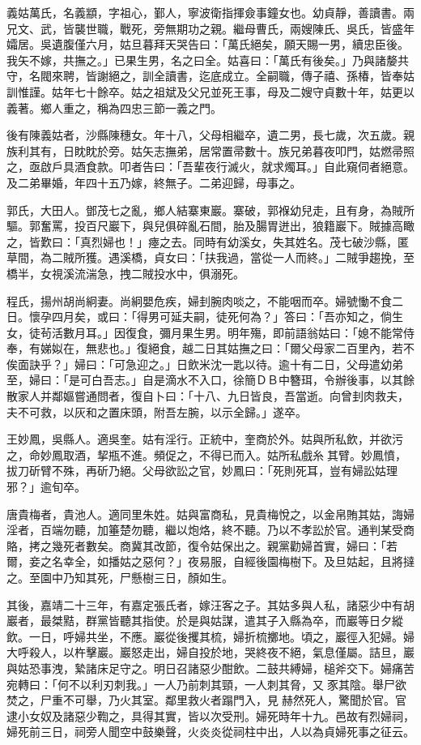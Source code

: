 \begin{pinyinscope}
義姑萬氏，名義顓，字祖心，鄞人，寧波衛指揮僉事鐘女也。幼貞靜，善讀書。兩兄文、武，皆襲世職，戰死，旁無期功之親。繼母曹氏，兩嫂陳氏、吳氏，皆盛年孀居。吳遺腹僅六月，姑旦暮拜天哭告曰：「萬氏絕矣，願天賜一男，續忠臣後。我矢不嫁，共撫之。」已果生男，名之曰全。姑喜曰：「萬氏有後矣。」乃與諸嫠共守，名閥來聘，皆謝絕之，訓全讀書，迄底成立。全嗣職，傳子禧、孫椿，皆奉姑訓惟謹。姑年七十餘卒。姑之祖斌及父兄並死王事，母及二嫂守貞數十年，姑更以義著。鄉人重之，稱為四忠三節一義之門。

後有陳義姑者，沙縣陳穗女。年十八，父母相繼卒，遺二男，長七歲，次五歲。親族利其有，日眈眈於旁。姑矢志撫弟，居常置帚數十。族兄弟暮夜叩門，姑燃帚照之，亟啟戶具酒食款。叩者告曰：「吾輩夜行滅火，就求燭耳。」自此窺伺者絕意。及二弟畢婚，年四十五乃嫁，終無子。二弟迎歸，母事之。

郭氏，大田人。鄧茂七之亂，鄉人結寨東巖。寨破，郭褓幼兒走，且有身，為賊所驅。郭奮罵，投百尺巖下，與兒俱碎亂石間，胎及腸胃迸出，狼籍巖下。賊據高瞰之，皆歎曰：「真烈婦也！」瘞之去。同時有幼溪女，失其姓名。茂七破沙縣，匿草間，為二賊所獲。遇溪橋，貞女曰：「扶我過，當從一人而終。」二賊爭趨挽，至橋半，女視溪流湍急，拽二賊投水中，俱溺死。

程氏，揚州胡尚絅妻。尚絅嬰危疾，婦刲腕肉啖之，不能咽而卒。婦號慟不食二日。懷孕四月矣，或曰：「得男可延夫嗣，徒死何為？」答曰：「吾亦知之，倘生女，徒茍活數月耳。」因復食，彌月果生男。明年殤，即前語翁姑曰：「媳不能常侍奉，有娣姒在，無悲也。」復絕食，越二日其姑撫之曰：「爾父母家二百里內，若不俟面訣乎？」婦曰：「可急迎之。」日飲米沈一匙以待。逾十有二日，父母遣幼弟至，婦曰：「是可白吾志。」自是滴水不入口，徐簡ＤＢ中簪珥，令辦後事，以其餘散家人并鄰嫗嘗通問者，復自卜曰：「十八、九日皆良，吾當逝。向曾刲肉救夫，夫不可救，以灰和之置床頭，附吾左腕，以示全歸。」遂卒。

王妙鳳，吳縣人。適吳奎。姑有淫行。正統中，奎商於外。姑與所私飲，并欲污之，命妙鳳取酒，挈瓶不進。頻促之，不得已而入。姑所私戲糸其臂。妙鳳憤，拔刀斫臂不殊，再斫乃絕。父母欲訟之官，妙鳳曰：「死則死耳，豈有婦訟姑理邪？」逾旬卒。

唐貴梅者，貴池人。適同里朱姓。姑與富商私，見貴梅悅之，以金帛賄其姑，誨婦淫者，百端勿聽，加箠楚勿聽，繼以炮烙，終不聽。乃以不孝訟於官。通判某受商賂，拷之幾死者數矣。商冀其改節，復令姑保出之。親黨勸婦首實，婦曰：「若爾，妾之名幸全，如播姑之惡何？」夜易服，自經後園梅樹下。及旦姑起，且將撻之。至園中乃知其死，尸懸樹三日，顏如生。

其後，嘉靖二十三年，有嘉定張氏者，嫁汪客之子。其姑多與人私，諸惡少中有胡巖者，最桀黠，群黨皆聽其指使。於是與姑謀，遣其子入縣為卒，而巖等日夕縱飲。一日，呼婦共坐，不應。巖從後攫其梳，婦折梳擲地。頃之，巖徑入犯婦。婦大呼殺人，以杵擊巖。巖怒走出，婦自投於地，哭終夜不絕，氣息僅屬。詰旦，巖與姑恐事洩，縶諸床足守之。明日召諸惡少酣飲。二鼓共縛婦，槌斧交下。婦痛苦宛轉曰：「何不以利刃刺我。」一人乃前刺其頸，一人刺其脅，又豕其陰。舉尸欲焚之，尸重不可舉，乃火其室。鄰里救火者蹋門入，見赫然死人，驚聞於官。官逮小女奴及諸惡少鞫之，具得其實，皆以次受刑。婦死時年十九。邑故有烈婦祠，婦死前三日，祠旁人聞空中鼓樂聲，火炎炎從祠柱中出，人以為貞婦死事之征云。


\end{pinyinscope}
